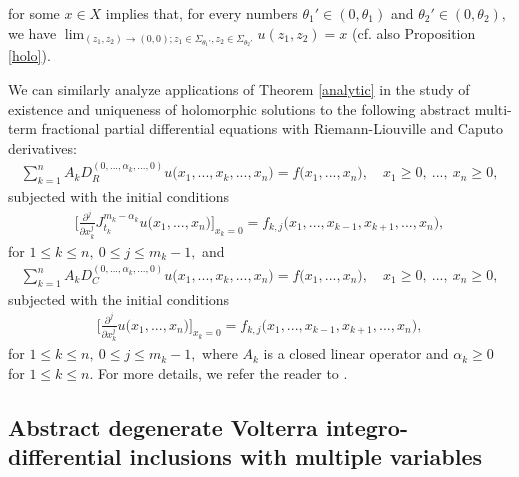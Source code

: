 \documentclass{amsart}
\theoremstyle{definition}
\theoremstyle{remark}
\numberwithin{equation}{section}
\begin{document}
for some $x\in X$ 
implies that, for every numbers $\theta_{1}' \in (0,\theta_{1})$ and $\theta_{2}' \in (0,\theta_{2}),$ we have $\lim_{(z_{1},z_{2})\rightarrow (0,0); z_{1}\in \Sigma_{\theta_{1}'}, z_{2}\in \Sigma_{\theta_{2}'}}u(z_{1},z_{2})=x$ (cf. also Proposition \ref{holo}).

We can similarly analyze applications of Theorem \ref{analytic} in the study of existence and uniqueness of holomorphic solutions to the following abstract multi-term fractional partial differential equations with Riemann-Liouville and Caputo derivatives:
\begin{align*} 
\sum_{k=1}^{n}A_{k}D_{R}^{(0,...,\alpha_{k},...,0)}u\bigl(x_{1},...,x_{k},...,x_{n}\bigr)=f\bigl(x_{1},...,x_{n}\bigr),\quad x_{1}\geq 0,\ ...,\ x_{n}\geq 0,
\end{align*}
subjected with the initial conditions 
\begin{align*}
\Biggl[ \frac{\partial^{j}}{\partial x_{k}^{j} }J_{t_{k}}^{m_{k}-\alpha_{k}}u\bigl(x_{1},...,x_{n}\bigr)\Biggr]_{x_{k}=0}=f_{k,j}\bigl(x_{1},...,x_{k-1},x_{k+1},...,x_{n}\bigr),
\end{align*}
for $1\leq k\leq n,\ 0\leq j\leq m_{k}-1,$
and
\begin{align*}
\sum_{k=1}^{n}A_{k}D_{C}^{(0,...,\alpha_{k},...,0)}u\bigl(x_{1},...,x_{k},...,x_{n}\bigr)=f\bigl(x_{1},...,x_{n}\bigr),\quad x_{1}\geq 0,\ ...,\ x_{n}\geq 0,
\end{align*}
subjected with the initial conditions 
\begin{align*}
\Biggl[ \frac{\partial^{j}}{\partial x_{k}^{j} }u\bigl(x_{1},...,x_{n}\bigr) \Biggr]_{x_{k}=0}=f_{k,j}\bigl(x_{1},...,x_{k-1},x_{k+1},...,x_{n}\bigr),
\end{align*}
for $1\leq k\leq n,\ 0\leq j\leq m_{k}-1,$
where $A_{k}$ is a closed linear operator and $\alpha_{k}\geq 0$ for $1\leq k\leq n.$ For more details, we refer the reader to \cite[Subsection 6.2]{axioms}.

\subsection{Abstract degenerate Volterra integro-differential inclusions with multiple variables}\label{sajkote}
\end{document}
